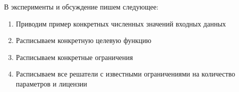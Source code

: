 В эксперименты и обсуждение пишем следующее:

\begin{enumerate}
	\item Приводим пример конкретных численных значений входных данных
	\item Расписываем конкретную целевую функцию
	\item Расписываем конкретные ограничения
	\item Расписываем все решатели с известными ограничениями на количество параметров и лицензии
\end{enumerate}